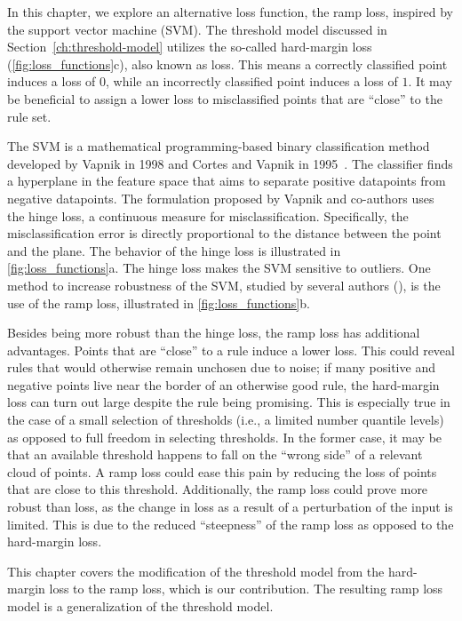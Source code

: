 In this chapter, we explore an alternative loss function, the ramp loss, inspired by the support vector machine (SVM).
The threshold model discussed in Section~\ref{ch:threshold-model} utilizes the so-called hard-margin loss (\autoref{fig:loss_functions}c), also known as \zo loss.
This means a correctly classified point induces a loss of $0$, while an incorrectly classified point induces a loss of $1$.
It may be beneficial to assign a lower loss to misclassified points that are ``close'' to the rule set.

The SVM is a mathematical programming-based binary classification method developed by Vapnik in 1998 and Cortes and Vapnik in 1995~\cite{vapnik_statistical_1998, cortes_support-vector_1995, brooks_support_2011}.
The classifier finds a hyperplane in the feature space that aims to separate positive datapoints from negative datapoints.
The formulation proposed by Vapnik and co-authors uses the hinge loss, a continuous measure for misclassification.
Specifically, the misclassification error is directly proportional to the distance between the point and the plane.
The behavior of the hinge loss is illustrated in \autoref{fig:loss_functions}a.
The hinge loss makes the SVM sensitive to outliers.
One method to increase robustness of the SVM, studied by several authors (\cite{brooks_support_2011, belotti_spatial_2024}),
is the use of the ramp loss, illustrated in \autoref{fig:loss_functions}b.

Besides being more robust than the hinge loss, the ramp loss has additional advantages.
Points that are ``close'' to a rule induce a lower loss.
This could reveal rules that would otherwise remain unchosen due to noise;
if many positive and negative points live near the border of an otherwise good rule,
the hard-margin loss can turn out large despite the rule being promising.
This is especially true in the case of a small selection of thresholds (i.e., a limited number quantile levels)
as opposed to full freedom in selecting thresholds.
In the former case, it may be that an available threshold happens to fall on the ``wrong side'' of a
relevant cloud of points.
A ramp loss could ease this pain by reducing the loss of points that are close to this threshold.
Additionally, the ramp loss could prove more robust than \zo loss,
as the change in loss as a result of a perturbation of the input is limited.
This is due to the reduced ``steepness'' of the ramp loss as opposed to the hard-margin loss.

This chapter covers the modification of the threshold model from the hard-margin loss to the ramp loss,
which is our contribution.
The resulting ramp loss model is a generalization of the threshold model.


